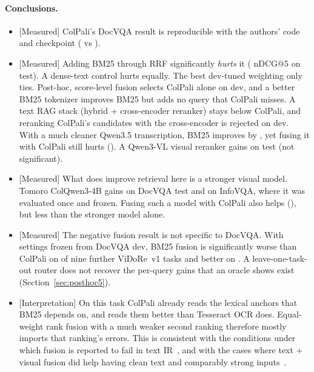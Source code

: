 \documentclass[11pt,a4paper]{article}
\newcommand{\lbl}[2]{\textsf{\scriptsize\textcolor{#1}{[#2]}}}
\newcommand{\Int}{\lbl{tagI}{Interpretation}}
\newcommand{\Mea}{\lbl{tagM}{Measured}}
\begin{document}
\paragraph{Conclusions.}
\begin{itemize}
  \item \Mea{} ColPali's DocVQA result is reproducible with the authors' code and checkpoint (\fullB{} vs \pubCard{}).
  \item \Mea{} Adding BM25 through RRF significantly \emph{hurts} it (\deltaC{} nDCG@5 on test). A dense-text control hurts equally. The best dev-tuned weighting only ties. Post-hoc, score-level fusion selects ColPali alone on dev, and a better BM25 tokenizer improves BM25 but adds no query that ColPali misses. A text RAG stack (hybrid + cross-encoder reranker) stays \deltaTrr{} below ColPali, and reranking ColPali's candidates with the cross-encoder is rejected on dev. With a much cleaner Qwen3.5 transcription, BM25 improves by \deltaAvlmA{}, yet fusing it with ColPali still hurts (\deltaCvlm{}). A Qwen3-VL visual reranker gains \deltaBvr{} on test (not significant).
  \item \Mea{} What does improve retrieval here is a stronger visual model. Tomoro ColQwen3-4B gains \deltaTM{} on DocVQA test and \infoDelta{} on InfoVQA, where it was evaluated once and frozen. Fusing such a model with ColPali also helps (\deltaFtm{}), but less than the stronger model alone.
  \item \Mea{} The negative fusion result is not specific to DocVQA. With settings frozen from DocVQA dev, BM25 fusion is significantly worse than ColPali on \pfSigLoss{} of nine further ViDoRe~v1 tasks and better on \pfSigGain{}. A leave-one-task-out router does not recover the per-query gains that an oracle shows exist (Section~\ref{sec:posthoc5}).
  \item \Int{} On this task ColPali already reads the lexical anchors that BM25 depends on, and reads them better than Tesseract OCR does. Equal-weight rank fusion with a much weaker second ranking therefore mostly imports that ranking's errors. This is consistent with the conditions under which fusion is reported to fail in text IR~\cite{bruch}, and with the cases where text + visual fusion did help having clean text and comparably strong inputs~\cite{irpapers}.
\end{itemize}
\end{document}
